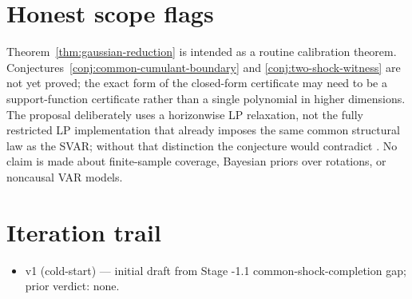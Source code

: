 \documentclass[11pt]{article}
\theoremstyle{definition}
\theoremstyle{plain}
\theoremstyle{remark}
\begin{document}
\section{Honest scope flags}
Theorem~\ref{thm:gaussian-reduction} is intended as a routine calibration theorem.  Conjectures~\ref{conj:common-cumulant-boundary} and \ref{conj:two-shock-witness} are not yet proved; the exact form of the closed-form certificate may need to be a support-function certificate rather than a single polynomial in higher dimensions.  The proposal deliberately uses a horizonwise LP relaxation, not the fully restricted LP implementation that already imposes the same common structural law as the SVAR; without that distinction the conjecture would contradict \citet{PlagborgMollerWolf2021}.  No claim is made about finite-sample coverage, Bayesian priors over rotations, or noncausal VAR models.

\section{Iteration trail}
\begin{itemize}[leftmargin=*]
\item v1 (cold-start) --- initial draft from Stage -1.1 common-shock-completion gap; prior verdict: none.
\end{itemize}
\end{document}
